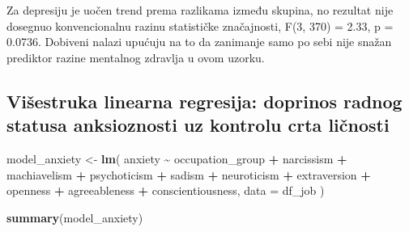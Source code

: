 \documentclass[
]{article}
\newenvironment{Shaded}{\begin{snugshade}}{\end{snugshade}}
\newcommand{\AttributeTok}[1]{\textcolor[rgb]{0.13,0.29,0.53}{#1}}
\newcommand{\FunctionTok}[1]{\textcolor[rgb]{0.13,0.29,0.53}{\textbf{#1}}}
\newcommand{\NormalTok}[1]{#1}
\newcommand{\OtherTok}[1]{\textcolor[rgb]{0.56,0.35,0.01}{#1}}
\newcommand{\SpecialCharTok}[1]{\textcolor[rgb]{0.81,0.36,0.00}{\textbf{#1}}}
\begin{document}
Za depresiju je uočen trend prema razlikama između skupina, no rezultat
nije dosegnuo konvencionalnu razinu statističke značajnosti, F(3, 370) =
2.33, p = 0.0736. Dobiveni nalazi upućuju na to da zanimanje samo po
sebi nije snažan prediktor razine mentalnog zdravlja u ovom uzorku.

\subsection{Višestruka linearna regresija: doprinos radnog statusa
anksioznosti uz kontrolu crta
ličnosti}\label{viux161estruka-linearna-regresija-doprinos-radnog-statusa-anksioznosti-uz-kontrolu-crta-liux10dnosti}

\begin{Shaded}
\begin{Highlighting}[]
\NormalTok{model\_anxiety }\OtherTok{\textless{}{-}} \FunctionTok{lm}\NormalTok{(}
\NormalTok{  anxiety }\SpecialCharTok{\textasciitilde{}}\NormalTok{ occupation\_group }\SpecialCharTok{+} 
\NormalTok{  narcissism }\SpecialCharTok{+}\NormalTok{ machiavelism }\SpecialCharTok{+}\NormalTok{ psychoticism }\SpecialCharTok{+}\NormalTok{ sadism }\SpecialCharTok{+}\NormalTok{ neuroticism }\SpecialCharTok{+}
\NormalTok{  extraversion }\SpecialCharTok{+}\NormalTok{ openness }\SpecialCharTok{+}\NormalTok{ agreeableness }\SpecialCharTok{+}\NormalTok{ conscientiousness,}
  \AttributeTok{data =}\NormalTok{ df\_job}
\NormalTok{)}

\FunctionTok{summary}\NormalTok{(model\_anxiety)}
\end{Highlighting}
\end{Shaded}
\end{document}
